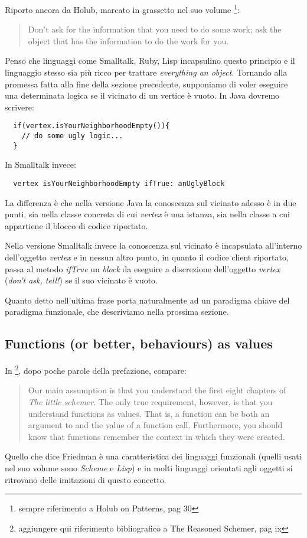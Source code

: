 Riporto ancora da Holub, marcato in grassetto nel suo volume
\footnote{sempre riferimento a Holub on Patterns, pag 30}:
\begin{quotation}
  Don't ask for the information that you need to do some work; ask the
  object that has the information to do the work for you.
\end{quotation}
Penso che linguaggi come Smalltalk, Ruby, Lisp incapsulino questo
principio e il linguaggio stesso sia pi\`u ricco per trattare
\emph{everything an object}. Tornando alla promessa fatta alla fine
della sezione precedente, supponiamo di voler eseguire una determinata
logica se il vicinato di un vertice \`e vuoto. In Java dovremo
scrivere:
\begin{lstlisting}
  if(vertex.isYourNeighborhoodEmpty()){
    // do some ugly logic...
  }
\end{lstlisting}
In Smalltalk invece:
\begin{lstlisting}
  vertex isYourNeighborhoodEmpty ifTrue: anUglyBlock
\end{lstlisting}
La differenza \`e che nella versione Java la conoscenza sul vicinato
adesso \`e in due punti, sia nella classe concreta di cui
\emph{vertex} \`e una istanza, sia nella classe a cui appartiene il
blocco di codice riportato.

Nella versione Smalltalk invece la conoscenza sul vicinato \`e
incapsulata all'interno dell'oggetto \emph{vertex} e in nessun altro
punto, in quanto il codice client riportato, passa al metodo
\emph{ifTrue} un \emph{block} da eseguire a discrezione dell'oggetto
\emph{vertex} (\emph{don't ask, tell!}) se il suo vicinato \`e vuoto.

Quanto detto nell'ultima frase porta naturalmente ad un paradigma
chiave del paradigma funzionale, che descriviamo nella prossima
sezione.

\subsection{Functions (or better, behaviours) as values}
In \footnote{aggiungere qui riferimento bibliografico a The Reasoned
  Schemer, pag ix}, dopo poche parole della prefazione, compare:
\begin{quotation}
  Our main assumption is that you understand the first eight chapters
  of \emph{The little schemer}. The only true requirement, however, is
  that you understand functions as values. That is, a function can be
  both an argument to and the value of a function call. Furthermore,
  you should know that functions remember the context in which they
  were created.
\end{quotation}
Quello che dice Friedman \`e una caratteristica dei linguaggi
funzionali (quelli usati nel suo volume sono \emph{Scheme} e
\emph{Lisp}) e in molti linguaggi orientati agli oggetti si ritrovano
delle imitazioni di questo concetto.

